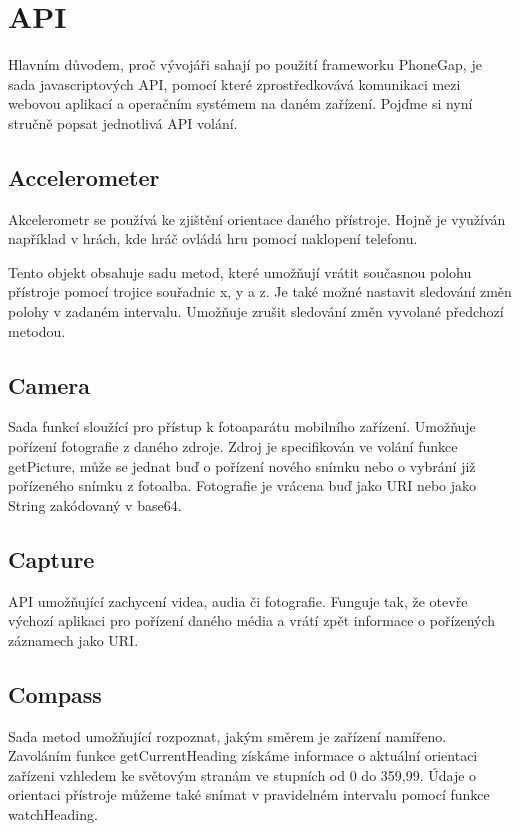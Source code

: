 \section{API} \label{Sec:API}
Hlavním důvodem, proč vývojáři sahají po použití frameworku PhoneGap, je sada javascriptových API, pomocí které zprostředkovává komunikaci mezi webovou aplikací a operačním systémem na daném zařízení. Pojďme si nyní stručně popsat jednotlivá API volání.

\subsection{Accelerometer}
Akcelerometr se používá ke zjištění orientace daného přístroje. Hojně je využíván například v hrách, kde hráč ovládá hru pomocí naklopení telefonu.

Tento objekt obsahuje sadu metod, které umožňují vrátit současnou polohu přístroje pomocí trojice souřadnic x, y a z. Je také možné nastavit sledování změn polohy v zadaném intervalu.
Umožňuje zrušit sledování změn vyvolané předchozí metodou.

\subsection{Camera}
Sada funkcí sloužící pro přístup k fotoaparátu mobilního zařízení. Umožňuje pořízení fotografie z daného zdroje. Zdroj je specifikován ve volání funkce getPicture, může se jednat buď o pořízení nového snímku nebo o vybrání již pořízeného snímku z fotoalba. Fotografie je vrácena buď jako URI nebo jako String zakódovaný v base64.

\subsection{Capture}
API umožňující zachycení videa, audia či fotografie. Funguje tak, že otevře výchozí aplikaci pro pořízení daného média a vrátí zpět informace o pořízených záznamech jako URI.

\subsection{Compass}
Sada metod umožňující rozpoznat, jakým směrem je zařízení namířeno. Zavoláním funkce getCurrentHeading získáme informace o aktuální orientaci zařízeni vzhledem ke světovým stranám ve stupních od 0 do 359,99. Údaje o orientaci přístroje můžeme také snímat v pravidelném intervalu pomocí funkce watchHeading.


